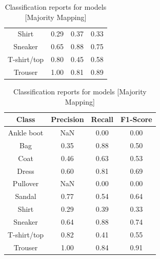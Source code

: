 \begin{table}[H]
\begin{minipage}{0.32\textwidth}
\begin{adjustbox}{max width=1\textwidth}
\begin{tabular}{|c|c|c|c|}
                Shirt & 0.29 & 0.37 & 0.33 \\ 
                Sneaker & 0.65 & 0.88 & 0.75 \\ 
                T-shirt/top & 0.80 & 0.45 & 0.58 \\ 
                Trouser & 1.00 & 0.81 & 0.89 \\ \hline
            \end{tabular}
        \end{adjustbox}
    \end{minipage}
    \hfill
    \begin{minipage}{0.32\textwidth}
        \centering
        \begin{adjustbox}{max width=1\textwidth}
            \begin{tabular}{|c|c|c|c|}
                \hline
                \textbf{Class} & \textbf{Precision} & \textbf{Recall} & \textbf{F1-Score} \\ \hline
                Ankle boot & NaN & 0.00 & 0.00 \\ 
                Bag & 0.35 & 0.88 & 0.50 \\ 
                Coat & 0.46 & 0.63 & 0.53 \\ 
                Dress & 0.60 & 0.81 & 0.69 \\ 
                Pullover & NaN & 0.00 & 0.00 \\ 
                Sandal & 0.77 & 0.54 & 0.64 \\ 
                Shirt & 0.29 & 0.39 & 0.33 \\ 
                Sneaker & 0.64 & 0.88 & 0.74 \\ 
                T-shirt/top & 0.82 & 0.41 & 0.55 \\ 
                Trouser & 1.00 & 0.84 & 0.91 \\ \hline
            \end{tabular}
        \end{adjustbox}
    \end{minipage}
    \caption{\footnotesize Classification reports for models [Majority Mapping]}
    \label{tab:ClassificationReport_Majority}
\end{table}

